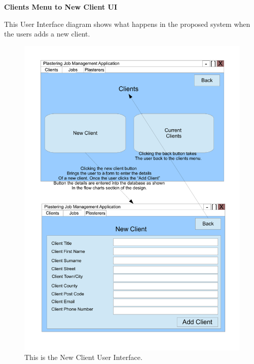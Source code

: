 \pagebreak
\textbf{Clients Menu to New Client UI}
\begin{flushleft}
This User Interface diagram shows what happens in the proposed system when the users adds a new client.
\end{flushleft}
\begin{figure}[H]
\includegraphics[scale=0.5]{./Design/images/UI-NewClient.pdf}
    \caption{This is the New Client User Interface.} 
\label{fig:FlowChartNewClient}
\end{figure}

